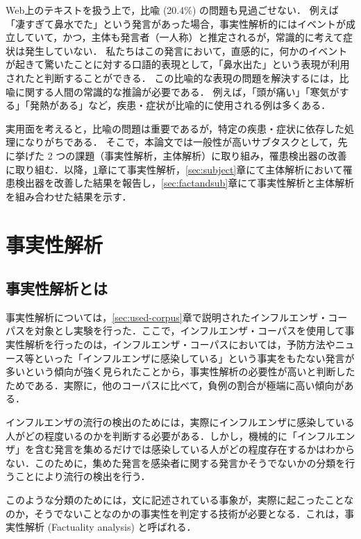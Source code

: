 \documentclass[japanese]{jnlp_1.4}
\begin{document}
Web上のテキストを扱う上で，比喩 (20.4\%) の問題も見過ごせない．
例えば「凄すぎて鼻水でた」という発言があった場合，事実性解析的にはイベントが成立していて，かつ，主体も発言者（一人称）と推定されるが，常識的に考えて症状は発生していない．
私たちはこの発言において，直感的に，何かのイベントが起きて驚いたことに対する口語的表現として，「鼻水出た」という表現が利用されたと判断することができる．
この比喩的な表現の問題を解決するには，比喩に関する人間の常識的な推論が必要である．
例えば，「頭が痛い」「寒気がする」「発熱がある」など，疾患・症状が比喩的に使用される例は多くある．

実用面を考えると，比喩の問題は重要であるが，特定の疾患・症状に依存した処理になりがちである．
そこで，本論文では一般性が高いサブタスクとして，先に挙げた 2 つの課題（事実性解析，主体解析）に取り組み，罹患検出器の改善に取り組む．以降，\ref{sec:factuality}章にて事実性解析，\ref{sec:subject}章にて主体解析において罹患検出器を改善した結果を報告し，\ref{sec:factandsub}章にて事実性解析と主体解析を組み合わせた結果を示す．




\section{事実性解析}
\label{sec:factuality}

\subsection{事実性解析とは}

事実性解析については，\ref{sec:used-corpus}章で説明されたインフルエンザ・コーパスを対象とし実験を行った．ここで，インフルエンザ・コーパスを使用して事実性解析を行ったのは，インフルエンザ・コーパスにおいては，予防方法やニュース等といった「インフルエンザに感染している」という事実をもたない発言が多いという傾向が強く見られたことから，事実性解析の必要性が高いと判断したためである．実際に，他のコーパスに比べて，負例の割合が極端に高い傾向がある．

インフルエンザの流行の検出のためには，実際にインフルエンザに感染している人がどの程度いるのかを判断する必要がある．しかし，機械的に「インフルエンザ」を含む発言を集めるだけでは感染している人がどの程度存在するかはわからない．このために，集めた発言を感染者に関する発言かそうでないかの分類を行うことにより流行の検出を行う．

このような分類のためには，文に記述されている事象が，実際に起こったことなのか，そうでないことなのかの事実性を判定する技術が必要となる．これは，事実性解析 (Factuality analysis) と呼ばれる\cite{sauri2012you}．
\end{document}
